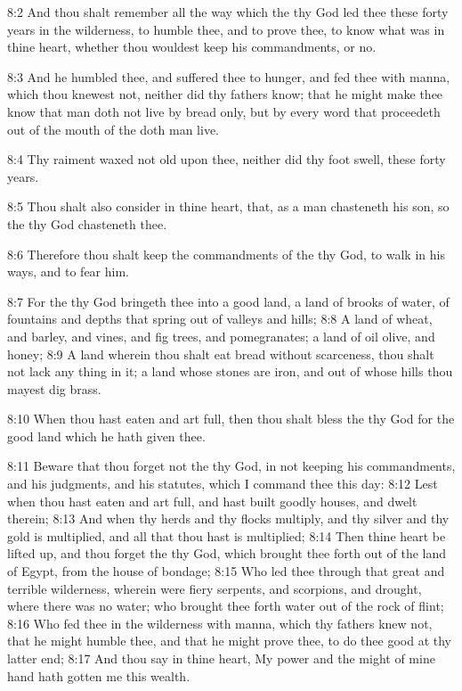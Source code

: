 8:2 And thou shalt remember all the way which the \LORD thy God led
thee these forty years in the wilderness, to humble thee, and to prove
thee, to know what was in thine heart, whether thou wouldest keep his
commandments, or no.

8:3 And he humbled thee, and suffered thee to hunger, and fed thee
with manna, which thou knewest not, neither did thy fathers know; that
he might make thee know that man doth not live by bread only, but by
every word that proceedeth out of the mouth of the \LORD doth man live.

8:4 Thy raiment waxed not old upon thee, neither did thy foot swell,
these forty years.

8:5 Thou shalt also consider in thine heart, that, as a man chasteneth
his son, so the \LORD thy God chasteneth thee.

8:6 Therefore thou shalt keep the commandments of the \LORD thy God, to
walk in his ways, and to fear him.

8:7 For the \LORD thy God bringeth thee into a good land, a land of
brooks of water, of fountains and depths that spring out of valleys
and hills; 8:8 A land of wheat, and barley, and vines, and fig trees,
and pomegranates; a land of oil olive, and honey; 8:9 A land wherein
thou shalt eat bread without scarceness, thou shalt not lack any thing
in it; a land whose stones are iron, and out of whose hills thou
mayest dig brass.

8:10 When thou hast eaten and art full, then thou shalt bless the \LORD
thy God for the good land which he hath given thee.

8:11 Beware that thou forget not the \LORD thy God, in not keeping his
commandments, and his judgments, and his statutes, which I command
thee this day: 8:12 Lest when thou hast eaten and art full, and hast
built goodly houses, and dwelt therein; 8:13 And when thy herds and
thy flocks multiply, and thy silver and thy gold is multiplied, and
all that thou hast is multiplied; 8:14 Then thine heart be lifted up,
and thou forget the \LORD thy God, which brought thee forth out of the
land of Egypt, from the house of bondage; 8:15 Who led thee through
that great and terrible wilderness, wherein were fiery serpents, and
scorpions, and drought, where there was no water; who brought thee
forth water out of the rock of flint; 8:16 Who fed thee in the
wilderness with manna, which thy fathers knew not, that he might
humble thee, and that he might prove thee, to do thee good at thy
latter end; 8:17 And thou say in thine heart, My power and the might
of mine hand hath gotten me this wealth.

